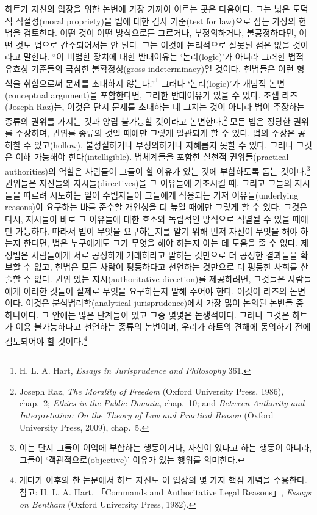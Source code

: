 하트가 자신의 입장을 위한 논변에 가장 가까이 이르는 곳은 다음이다. 그는
넓은 도덕적 적절성(moral propriety)을 법에 대한 검사 기준(test for
law)으로 삼는 가상의 헌법을 검토한다. 어떤 것이 어떤 방식으로든
그르거나, 부정의하거나, 불공정하다면, 어떤 것도 법으로 간주되어서는 안
된다. 그는 이것에 논리적으로 잘못된 점은 없을 것이라고 말한다. “이
비범한 장치에 대한 반대이유는 ‘논리(logic)’가 아니라 그러한 법적 유효성
기준들의 극심한 불확정성(gross indeterminacy)일 것이다. 헌법들은 이런
형식을 취함으로써 문제를 초대하지 않는다.”\footnote{H. L. A. Hart,
  \emph{Essays in Jurisprudence and Philosophy} 361.} 그러나
‘논리(logic)’가 개념적 논변(conceptual argument)을 포함한다면, 그러한
반대이유가 있을 수 있다. 조셉 라즈(Joseph Raz)는, 이것은 단지 문제를
초대하는 데 그치는 것이 아니라 법이 주장하는 종류의 권위를 가지는 것과
양립 불가능할 것이라고 논변한다.\footnote{Joseph Raz, \emph{The Morality
  of Freedom} (Oxford University Press, 1986), chap.~2; \emph{Ethics in
  the Public Domain}, chap.~10; and \emph{Between Authority and
  Interpretation: On the Theory of Law and Practical Reason} (Oxford
  University Press, 2009), chap.~5.} 모든 법은 정당한 권위를 주장하며,
권위를  종류의 것일 때에만 그렇게 일관되게 할 수
있다. 법의 주장은 공허할 수 있고(hollow), 불성실하거나 부정의하거나
지혜롭지 못할 수 있다. 그러나 그것은 이해 가능해야 한다(intelligible).
법체계들을 포함한 실천적 권위들(practical authorities)의 역할은 사람들이
그들이 할 이유가 있는 것에 부합하도록 돕는 것이다.\footnote{이는 단지
  그들이  이익에 부합하는 행동이거나, 자신이
   있다고  하는 행동이 아니라,
  그들이 ‘객관적으로(objective)’ 이유가 있는 행위를 의미한다.} 권위들은
자신들의 지시들(directives)을 그 이유들에 기초시킬 때, 그리고 그들의
지시들을 따르려 시도하는 일이 수범자들이 그들에게 적용되는 기저
이유들(underlying reasons)이 요구하는 바를 준수할 개연성을 더 높일
때에만 그렇게 할 수 있다. 그것은 다시, 지시들이 바로 그 이유들에 대한
호소와 독립적인 방식으로 식별될 수 있을 때에만 가능하다. 따라서 법이
무엇을 요구하는지를 알기 위해 먼저 자신이 무엇을 해야 하는지
 한다면, 법은 누구에게도 그가 무엇을 해야
하는지 아는 데 도움을 줄 수 없다. 제정법은 사람들에게 서로 공정하게
거래하라고 말하는 것만으로 더 공정한 결과들을 확보할 수 없고, 헌법은
모든 사람이 평등하다고 선언하는 것만으로 더 평등한 사회를 산출할 수
없다. 권위 있는 지시(authoritative direction)를 제공하려면, 그것들은
사람들에게 이러한 것들이 실제로 무엇을 요구하는지 말해 주어야 한다.
이것이 라즈의 논변이다. 이것은 분석법리학(analytical jurisprudence)에서
가장 많이 논의된 논변들 중 하나이다. 그 안에는 많은 단계들이 있고 그중
몇몇은 논쟁적이다. 그러나 그것은 하트가 이용 불가능하다고 선언하는
종류의 논변이며, 우리가 하트의 견해에 동의하기 전에 검토되어야 할
것이다.\footnote{게다가 이후의 한 논문에서 하트 자신도 이 입장의 몇 가지
  핵심 개념을 수용한다. 참고: H. L. A. Hart, 「Commands and
  Authoritative Legal Reasons」, \emph{Essays on Bentham} (Oxford
  University Press, 1982).}

